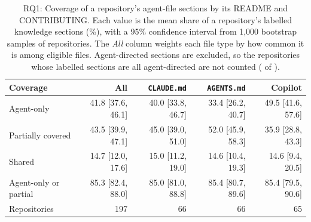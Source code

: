\begin{table}[t]
\caption{RQ1: Coverage of a repository's agent-file sections by its README and CONTRIBUTING. Each value is the mean share of a repository's labelled knowledge sections (\%), with a 95\% confidence interval from 1{,}000 bootstrap samples of repositories. The \emph{All} column weights each file type by how common it is among eligible files. Agent-directed sections are excluded, so the \nReposNoKnowledge{} repositories whose labelled sections are all agent-directed are not counted (\nRepoKnowledge{} of \nSampleRepos{}).}
\label{tab:rq1}
\small
\begin{tabular}{lrrrr}
\toprule
Coverage & All & \texttt{CLAUDE.md} & \texttt{AGENTS.md} & Copilot \\
\midrule
Agent-only & 41.8 {\scriptsize[37.6, 46.1]} & 40.0 {\scriptsize[33.8, 46.7]} & 33.4 {\scriptsize[26.2, 40.7]} & 49.5 {\scriptsize[41.6, 57.6]} \\
Partially covered & 43.5 {\scriptsize[39.9, 47.1]} & 45.0 {\scriptsize[39.0, 51.0]} & 52.0 {\scriptsize[45.9, 58.3]} & 35.9 {\scriptsize[28.8, 43.3]} \\
Shared & 14.7 {\scriptsize[12.0, 17.6]} & 15.0 {\scriptsize[11.2, 19.0]} & 14.6 {\scriptsize[10.4, 19.3]} & 14.6 {\scriptsize[9.4, 20.5]} \\
Agent-only or partial & 85.3 {\scriptsize[82.4, 88.0]} & 85.0 {\scriptsize[81.0, 88.8]} & 85.4 {\scriptsize[80.7, 89.6]} & 85.4 {\scriptsize[79.5, 90.6]} \\
\midrule
Repositories & 197 & 66 & 66 & 65 \\
\bottomrule
\end{tabular}
\end{table}

